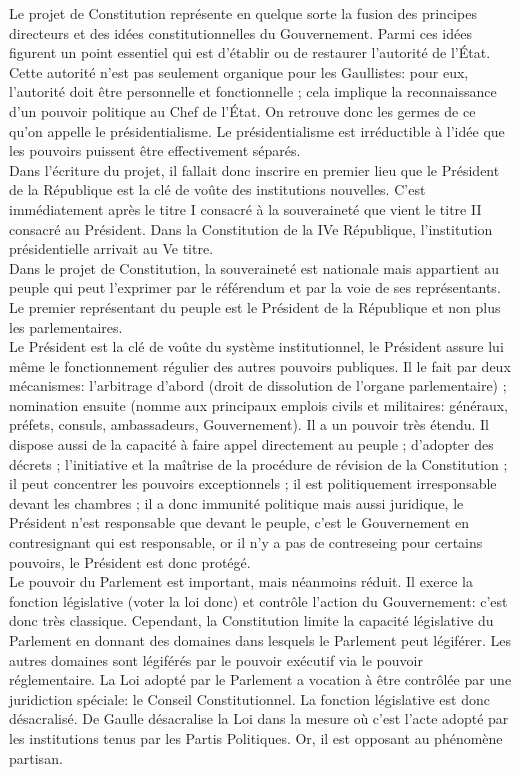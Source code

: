 \documentclass[12pt, a4paper, openany]{book}
\begin{document}
Le projet de Constitution représente en quelque sorte la fusion des principes directeurs et des idées constitutionnelles du Gouvernement. Parmi ces idées figurent un point essentiel qui est d'établir ou de restaurer l'autorité de l'État. Cette autorité n'est pas seulement organique pour les Gaullistes: pour eux, l'autorité doit être personnelle et fonctionnelle ; cela implique la reconnaissance d'un pouvoir politique au Chef de l'État. On retrouve donc les germes de ce qu'on appelle le présidentialisme. Le présidentialisme est irréductible à l'idée que les pouvoirs puissent être effectivement séparés. \\
Dans l'écriture du projet, il fallait donc inscrire en premier lieu que le Président de la République est la clé de voûte des institutions nouvelles. C'est immédiatement après le titre I consacré à la souveraineté que vient le titre II consacré au Président. Dans la Constitution de la IVe République, l'institution présidentielle arrivait au Ve titre. \\
Dans le projet de Constitution, la souveraineté est nationale mais appartient au peuple qui peut l'exprimer par le référendum et par la voie de ses représentants. Le premier représentant du peuple est le Président de la République et non plus les parlementaires. \\
Le Président est la clé de voûte du système institutionnel, le Président assure lui même le fonctionnement régulier des autres pouvoirs publiques. Il le fait par deux mécanismes: l'arbitrage d'abord (droit de dissolution de l'organe parlementaire) ; nomination ensuite (nomme aux principaux emplois civils et militaires: généraux, préfets, consuls, ambassadeurs, Gouvernement). Il a un pouvoir très étendu. Il dispose aussi de la capacité à faire appel directement au peuple ; d'adopter des décrets ; l'initiative et la maîtrise de la procédure de révision de la Constitution ; il peut concentrer les pouvoirs exceptionnels ; il est politiquement irresponsable devant les chambres ; il a donc immunité politique mais aussi juridique, le Président n'est responsable que devant le peuple, c'est le Gouvernement en contresignant qui est responsable, or il n'y a pas de contreseing pour certains pouvoirs, le Président est donc protégé. \\
Le pouvoir du Parlement est important, mais néanmoins réduit. Il exerce la fonction législative (voter la loi donc) et contrôle l'action du Gouvernement: c'est donc très classique. Cependant, la Constitution limite la capacité législative du Parlement en donnant des domaines dans lesquels le Parlement peut légiférer. Les autres domaines sont légiférés par le pouvoir exécutif via le pouvoir réglementaire. La Loi adopté par le Parlement a vocation à être contrôlée par une juridiction spéciale: le Conseil Constitutionnel. La fonction législative est donc désacralisé. De Gaulle désacralise la Loi dans la mesure où c'est l'acte adopté par les institutions tenus par les Partis Politiques. Or, il est opposant au phénomène partisan. \\
\end{document}

